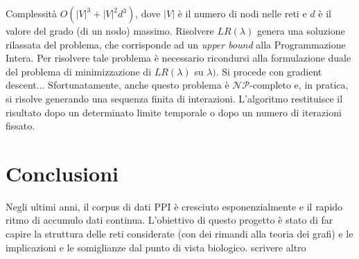 \documentclass[11pt]{article}
\begin{document}
Complessità $O(|V|^3 + |V|^2d^3)$, dove $|V|$ è il numero di nodi nelle reti e $d$ è il valore del grado (di un nodo) massimo. Risolvere $LR(\lambda)$ genera una soluzione rilassata del problema, che corrisponde ad un \textit{upper bound} alla Programmazione Intera. Per risolvere tale problema è necessario ricondursi alla formulazione duale del problema di minimizzazione di $LR(\lambda)$ su $\lambda)$. Si procede con gradient descent... Sfortunatamente, anche questo problema è $\mathcal{NP}$-completo e, in pratica, si risolve generando una sequenza finita di interazioni. L'algoritmo restituisce il risultato dopo un determinato limite temporale o dopo un numero di iterazioni fissato.

\pagebreak
\section{Conclusioni}
Negli ultimi anni, il corpus di dati PPI è cresciuto esponenzialmente e il rapido ritmo di accumulo dati continua. L'obiettivo di questo progetto è stato di far capire la struttura delle reti considerate (con dei rimandi alla teoria dei grafi) e le implicazioni  e le somiglianze dal punto di vista biologico. scrivere altro

\pagebreak 
\end{document}
